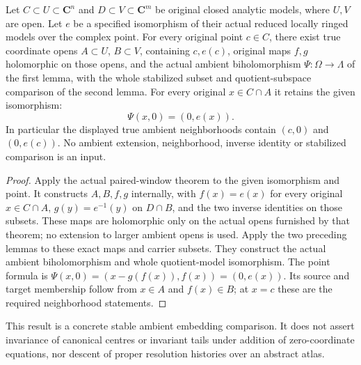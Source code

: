 \begin{theorem}
\label{hir:actual-intrinsic-iso-stable-ambient}
\leanok
Let $C\subset U\subset\mathbf C^n$ and $D\subset V\subset\mathbf C^m$ be original closed analytic models, where $U,V$ are open. Let $e$ be a specified isomorphism of their actual reduced locally ringed models over the complex point. For every original point $c\in C$, there exist true coordinate opens $A\subset U$, $B\subset V$, containing $c,e(c)$, original maps $f,g$ holomorphic on those opens, and the actual ambient biholomorphism $\Psi:\Omega\to\Lambda$ of the first lemma, with the whole stabilized subset and quotient-subspace comparison of the second lemma. For every original $x\in C\cap A$ it retains the given isomorphism:
\[
 \Psi(x,0)=(0,e(x)).
\]
In particular the displayed true ambient neighborhoods contain $(c,0)$ and $(0,e(c))$. No ambient extension, neighborhood, inverse identity or stabilized comparison is an input.
\end{theorem}
\begin{proof}
Apply the actual paired-window theorem to the given isomorphism and point. It constructs $A,B,f,g$ internally, with $f(x)=e(x)$ for every original $x\in C\cap A$, $g(y)=e^{-1}(y)$ on $D\cap B$, and the two inverse identities on those subsets. These maps are holomorphic only on the actual opens furnished by that theorem; no extension to larger ambient opens is used. Apply the two preceding lemmas to these exact maps and carrier subsets. They construct the actual ambient biholomorphism and whole quotient-model isomorphism. The point formula is $\Psi(x,0)=(x-g(f(x)),f(x))=(0,e(x))$. Its source and target membership follow from $x\in A$ and $f(x)\in B$; at $x=c$ these are the required neighborhood statements.
\end{proof}

This result is a concrete stable ambient embedding comparison. It does not assert invariance of canonical centres or invariant tails under addition of zero-coordinate equations, nor descent of proper resolution histories over an abstract atlas.
